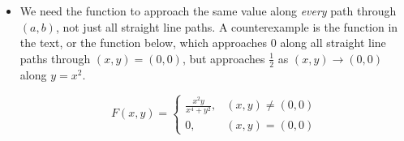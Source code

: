 \documentclass{ximera}
\begin{document}
\begin{exercise}
\begin{feedback}[correct]
\begin{itemize}
\item We need the function to approach the same value along \emph{every} path through $(a,b)$, not just all straight line paths.  A counterexample is the function in the text, or the function below, which approaches $0$ along all straight line paths through $(x,y) = (0,0)$, but approaches $\frac{1}{2}$ as $(x,y) \to (0,0)$ along $y=x^2$.

\[
F(x,y) = \begin{cases} \frac{x^2y}{x^4+y^2}, & (x,y) \neq (0,0) \\ 0, & (x,y) =(0,0) \end{cases}
\]

\end{itemize}
\end{feedback}
 \end{exercise}
\end{document}
